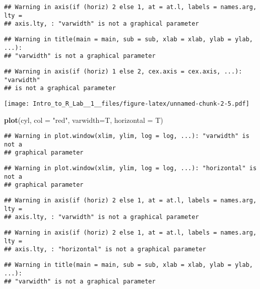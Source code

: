 \documentclass[]{article}
\newenvironment{Shaded}{\begin{snugshade}}{\end{snugshade}}
\newcommand{\KeywordTok}[1]{\textcolor[rgb]{0.13,0.29,0.53}{\textbf{#1}}}
\newcommand{\DataTypeTok}[1]{\textcolor[rgb]{0.13,0.29,0.53}{#1}}
\newcommand{\StringTok}[1]{\textcolor[rgb]{0.31,0.60,0.02}{#1}}
\newcommand{\NormalTok}[1]{#1}
\begin{document}
\begin{verbatim}
## Warning in axis(if (horiz) 2 else 1, at = at.l, labels = names.arg, lty =
## axis.lty, : "varwidth" is not a graphical parameter
\end{verbatim}

\begin{verbatim}
## Warning in title(main = main, sub = sub, xlab = xlab, ylab = ylab, ...):
## "varwidth" is not a graphical parameter
\end{verbatim}

\begin{verbatim}
## Warning in axis(if (horiz) 1 else 2, cex.axis = cex.axis, ...): "varwidth"
## is not a graphical parameter
\end{verbatim}

\texttt{[image: Intro\_to\_R\_Lab\_\_1\_\_files/figure-latex/unnamed-chunk-2-5.pdf]}

\begin{Shaded}
\begin{Highlighting}[]
\KeywordTok{plot}\NormalTok{(cyl, }\DataTypeTok{col =} \StringTok{"red"}\NormalTok{, }\DataTypeTok{varwidth=}\NormalTok{T, }\DataTypeTok{horizontal =}\NormalTok{ T)}
\end{Highlighting}
\end{Shaded}

\begin{verbatim}
## Warning in plot.window(xlim, ylim, log = log, ...): "varwidth" is not a
## graphical parameter
\end{verbatim}

\begin{verbatim}
## Warning in plot.window(xlim, ylim, log = log, ...): "horizontal" is not a
## graphical parameter
\end{verbatim}

\begin{verbatim}
## Warning in axis(if (horiz) 2 else 1, at = at.l, labels = names.arg, lty =
## axis.lty, : "varwidth" is not a graphical parameter
\end{verbatim}

\begin{verbatim}
## Warning in axis(if (horiz) 2 else 1, at = at.l, labels = names.arg, lty =
## axis.lty, : "horizontal" is not a graphical parameter
\end{verbatim}

\begin{verbatim}
## Warning in title(main = main, sub = sub, xlab = xlab, ylab = ylab, ...):
## "varwidth" is not a graphical parameter
\end{verbatim}
\end{document}
